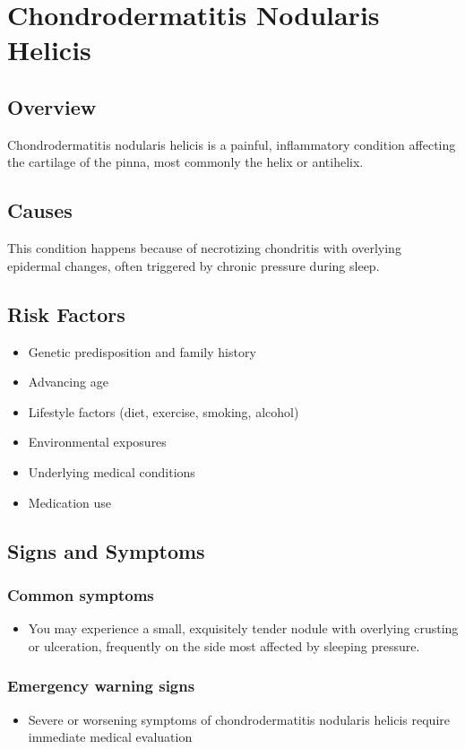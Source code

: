 \chapter{Chondrodermatitis Nodularis Helicis}
\label{sec:Chondrodermatitis Nodularis Helicis}

\section{Overview}
Chondrodermatitis nodularis helicis is a painful, inflammatory condition affecting the cartilage of the pinna, most commonly the helix or antihelix.
\section{Causes}
This condition happens because of necrotizing chondritis with overlying epidermal changes, often triggered by chronic pressure during sleep.     
\section{Risk Factors}

\begin{itemize}[noitemsep]
  \item Genetic predisposition and family history
  \item Advancing age
  \item Lifestyle factors (diet, exercise, smoking, alcohol)
  \item Environmental exposures
  \item Underlying medical conditions
  \item Medication use
\end{itemize}
\section{Signs and Symptoms}

\subsection{Common symptoms}
\begin{itemize}[noitemsep]
  \item You may experience a small, exquisitely tender nodule with overlying crusting or ulceration, frequently on the side most affected by sleeping pressure. 
  \end{itemize}

\subsection{Emergency warning signs}
\begin{itemize}[noitemsep]
  \item Severe or worsening symptoms of chondrodermatitis nodularis helicis require immediate medical evaluation
\end{itemize}
